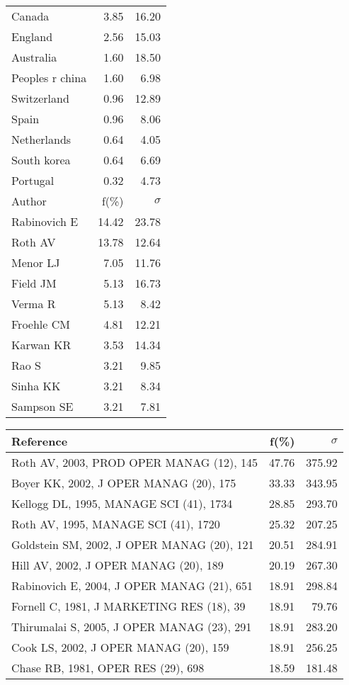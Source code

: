\documentclass[a4paper,11pt]{report}
\begin{document}
\begin{landscape}
\begin{table}[!ht]
{\begin{tabular}{|l r r|}
Canada & 3.85 & 16.20\\
England & 2.56 & 15.03\\
Australia & 1.60 & 18.50\\
Peoples r china & 1.60 & 6.98\\
Switzerland & 0.96 & 12.89\\
Spain & 0.96 & 8.06\\
Netherlands & 0.64 & 4.05\\
South korea & 0.64 & 6.69\\
Portugal & 0.32 & 4.73\\
\hline
\hline
Author & f(\%) & $\sigma$\\
\hline
Rabinovich E & 14.42 & 23.78\\
Roth AV & 13.78 & 12.64\\
Menor LJ & 7.05 & 11.76\\
Field JM & 5.13 & 16.73\\
Verma R & 5.13 & 8.42\\
Froehle CM & 4.81 & 12.21\\
Karwan KR & 3.53 & 14.34\\
Rao S & 3.21 & 9.85\\
Sinha KK & 3.21 & 8.34\\
Sampson SE & 3.21 & 7.81\\
\hline
\end{tabular}
}
{\scriptsize\begin{tabular}{|l r r|}
\hline
Reference & f(\%) & $\sigma$\\
\hline
Roth AV, 2003, PROD OPER MANAG (12), 145 & 47.76 & 375.92\\
Boyer KK, 2002, J OPER MANAG (20), 175 & 33.33 & 343.95\\
Kellogg DL, 1995, MANAGE SCI (41), 1734 & 28.85 & 293.70\\
Roth AV, 1995, MANAGE SCI (41), 1720 & 25.32 & 207.25\\
Goldstein SM, 2002, J OPER MANAG (20), 121 & 20.51 & 284.91\\
Hill AV, 2002, J OPER MANAG (20), 189 & 20.19 & 267.30\\
Rabinovich E, 2004, J OPER MANAG (21), 651 & 18.91 & 298.84\\
Fornell C, 1981, J MARKETING RES (18), 39 & 18.91 & 79.76\\
Thirumalai S, 2005, J OPER MANAG (23), 291 & 18.91 & 283.20\\
Cook LS, 2002, J OPER MANAG (20), 159 & 18.91 & 256.25\\
Chase RB, 1981, OPER RES (29), 698 & 18.59 & 181.48\\

\end{tabular}}
\end{table}
\end{landscape}
\end{document}
